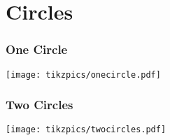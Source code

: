 \documentclass[../main.tex]{subfiles}
\begin{document}
\chapter{Circles}

\subsection{One Circle}

\texttt{[image: tikzpics/onecircle.pdf]}


\subsection{Two Circles}

\texttt{[image: tikzpics/twocircles.pdf]}
\end{document}
